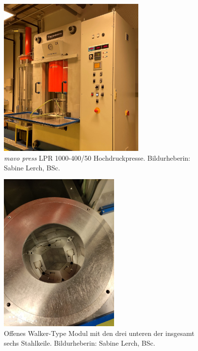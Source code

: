 \documentclass[12pt]{article}
\begin{document}
\begin{figure}[H]
    \centering
    \includegraphics[height=8cm]{Images/Presse.jpg}
    \caption{\textit{mavo press} LPR 1000-400/50 Hochdruckpresse. Bildurheberin: Sabine Lerch, BSc.}
    \label{fig:pressepresse}
\end{figure}
\begin{figure}[H]
    \centering
    \includegraphics[height=8cm]{Images/Walker.jpeg}
    \caption{Offenes Walker-Type Modul mit den drei unteren der insgesamt sechs Stahlkeile. Bildurheberin: Sabine Lerch, BSc.}
    \label{fig:walkerwalker}
\end{figure}
\end{document}
